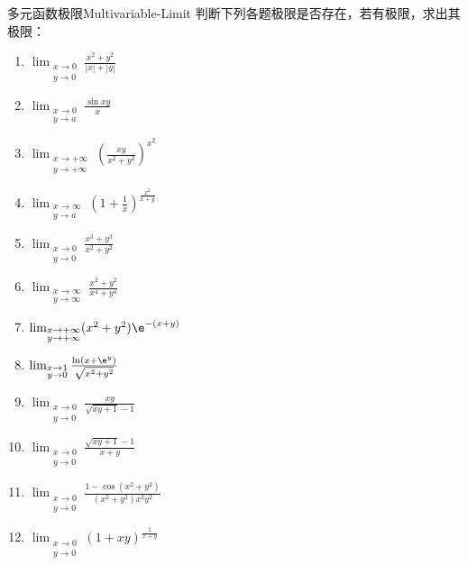 \begin{problem}{多元函数极限}{Multivariable-Limit}
    判断下列各题极限是否存在，若有极限，求出其极限：
    \begin{enumerate}
        \item $\lim_{\substack{x \to 0 \\ y \to 0}} \frac{x^2 + y^2}{|x| + |y|}$
        \item $\lim_{\substack{x \to 0 \\ y \to a}} \frac{\sin xy}{x}$
        \item $\lim_{\substack{x \to +\infty \\ y \to +\infty}} \left( \frac{xy}{x^2 + y^2} \right)^{x^2}$
        \item $\lim_{\substack{x \to \infty \\ y \to a}} \left( 1 + \frac{1}{x} \right)^{\frac{x^2}{x+y}}$
        \item $\lim_{\substack{x \to 0 \\ y \to 0}} \frac{x^3 + y^3}{x^2 + y^2}$
        \item $\lim_{\substack{x \to \infty \\ y \to \infty}} \frac{x^2 + y^2}{x^4 + y^4}$
        \item $\lim_{\substack{x \to +\infty \\ y \to +\infty}} (x^2 + y^2) \e^{-(x+y)}$
        \item $\lim_{\substack{x \to 1 \\ y \to 0}} \frac{\ln (x + \e^y)}{\sqrt{x^2 + y^2}}$
        \item $\lim_{\substack{x \to 0 \\ y \to 0}} \frac{xy}{\sqrt{xy+1}-1}$
        \item $\lim_{\substack{x \to 0 \\ y \to 0}} \frac{\sqrt{xy+1}-1}{x+y}$
        \item $\lim_{\substack{x \to 0 \\ y \to 0}} \frac{1-\cos(x^2+y^2)}{(x^2+y^2)x^2y^2}$
        \item $\lim_{\substack{x \to 0 \\ y \to 0}} (1 + xy)^{\frac{1}{x+y}}$
    \end{enumerate}
\end{problem}

